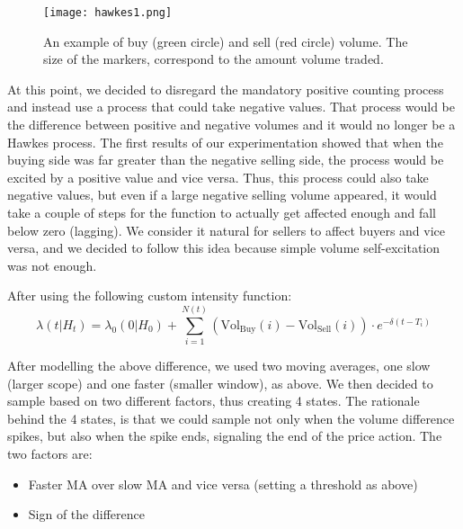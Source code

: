 \begin{figure}[H]
    \centering
    \texttt{[image: hawkes1.png]}
    \caption{An example of buy (green circle) and sell (red circle) volume. The size of the markers, correspond to the amount volume traded.}
    \label{fig:hawkes1}
\end{figure}


At this point, we decided to disregard the mandatory positive counting process and instead use a process that could take negative values. That process would be the difference between positive and negative volumes and it would no longer be a Hawkes process. The first results of our experimentation showed that when the buying side was far greater than the negative selling side, the process would be excited by a positive value and vice versa. Thus, this process could also take negative values, but even if a large negative selling volume appeared, it would take a couple of steps for the function to actually get affected enough and fall below zero (lagging). We consider it natural for sellers to affect buyers and vice versa, and we decided to follow this idea because simple volume self-excitation was not enough.

After using the following custom intensity function: 
\[ \lambda(t|H_t) = \lambda_0(0|H_0) + \sum_{i=1}^{N(t)}(\text{Vol}_{\text{Buy}}(i) - \text{Vol}_{\text{Sell}}(i)) \cdot e^{-\delta(t-T_i)} \]

After modelling the above difference, we used two moving averages, one slow (larger scope) and one faster (smaller window), as above. We then decided to sample based on two different factors, thus creating 4 states. The rationale behind the 4 states, is that we could sample not only when the volume difference spikes, but also when the spike ends, signaling the end of the price action.
The two factors are:
\begin{itemize}
\item Faster MA over slow MA and vice versa (setting a threshold as above)
\item Sign of the difference 
\end{itemize}

